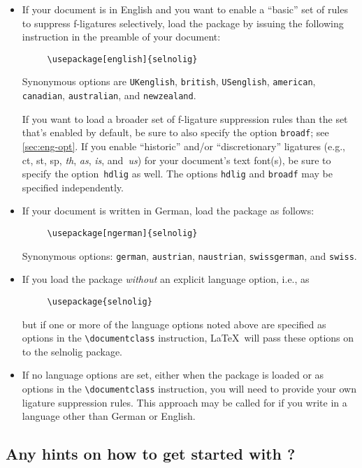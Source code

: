 \documentclass[11pt]{article}
\newcommand{\pkg}[1]{\textsf{#1}}
\newcommand{\opt}[1]{\texttt{#1}}
\newcommand{\cmmd}[1]{\texttt{\textbackslash #1}}
\begin{document}
\begin{itemize}
\item If your document is in English and you want to enable a \enquote{basic} set of rules to suppress f-ligatures selectively, load the package by issuing the following instruction in the preamble of your document:
\begin{Verbatim}
     \usepackage[english]{selnolig}
\end{Verbatim}
Synonymous options are \opt{UKenglish}, \opt{british}, \opt{USenglish}, \opt{american}, \opt{cana\-dian}, \opt{australian}, and \opt{new\-zea\-land}.

If you want to load a broader set of f-ligature suppression rules than the set that's enabled by default, be sure to also specify the option \opt{broadf}; see \cref{sec:eng-opt}.
If you enable \enquote{historic} and/or \enquote{discretionary} ligatures (e.g., ct, st, sp, \emph{th}, \emph{as}, \emph{is}, and~\emph{us}) for your document's text font(s), be sure to specify the option~\opt{hdlig} as well. The options \opt{hdlig} and \opt{broadf} may be specified independently.

\item If your document is written in German, load the package as follows:
\begin{Verbatim}
     \usepackage[ngerman]{selnolig}
\end{Verbatim}
Synonymous options: \opt{german}, \opt{austrian}, \opt{naustrian}, \opt{swissgerman}, and \opt{swiss}.

\item If you load the package \emph{without} an explicit language option, i.e., as
\begin{Verbatim}
     \usepackage{selnolig}
\end{Verbatim}
but if one or more of the language options noted above are specified as options in the \cmmd{documentclass} instruction, \LaTeX\ will pass these options on to the \pkg{selnolig} package.

\item If no language options are set, either when the package is loaded or as options in the \cmmd{documentclass} instruction, you will need to provide your own ligature suppression rules. This approach may be called for if you write in a language other than German or English.

\end{itemize}


\subsection{Any hints on how to get started with \LuaLaTeX?}
\end{document}
